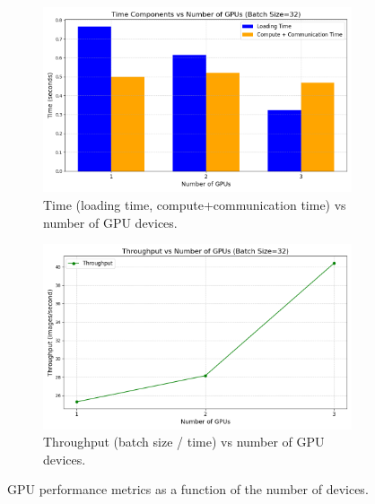 \documentclass{article}
\begin{document}
\begin{figure}[h!]
    \centering
    \begin{subfigure}[b]{0.48\textwidth}
        \centering
        \includegraphics[width=\textwidth]{GPU/gpu_time_components_bar.png}
        \caption{Time (loading time, compute+communication time) vs number of GPU devices.}
        \label{fig:gpu_time}
    \end{subfigure}
    \hfill
    \begin{subfigure}[b]{0.48\textwidth}
        \centering
        \includegraphics[width=\textwidth]{GPU/gpu_throughput_line.png}
        \caption{Throughput (batch size / time) vs number of GPU devices.}
        \label{fig:gpu_throughput}
    \end{subfigure}
    \caption{GPU performance metrics as a function of the number of devices.}
    \label{fig:gpu_plots}
\end{figure}
\end{document}
